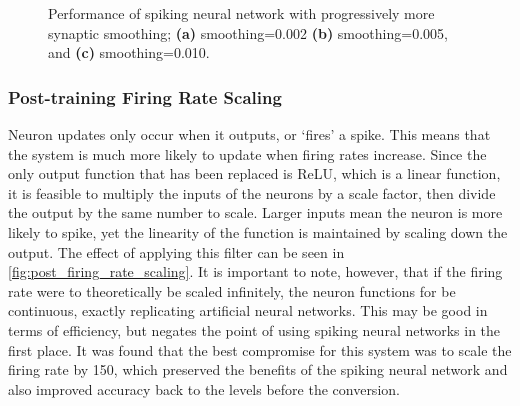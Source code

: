 \begin{figure}[htb]%
    \centering
    \qquad
    \qquad
    \caption{Performance of spiking neural network with progressively more synaptic smoothing; \textbf{(a)} smoothing=0.002 \textbf{(b)} smoothing=0.005, and \textbf{(c)} smoothing=0.010.}%
    \label{fig:post_synaptic_smoothing}%
\end{figure}

\subsubsection{Post-training Firing Rate Scaling} \label{sssec:firing_rate_scaling}

Neuron updates only occur when it outputs, or `fires' a spike. This means that the system is much more likely to update when firing rates increase. Since the only output function that has been replaced is ReLU, which is a linear function, it is feasible to multiply the inputs of the neurons by a scale factor, then divide the output by the same number to scale. Larger inputs mean the neuron is more likely to spike, yet the linearity of the function is maintained by scaling down the output. The effect of applying this filter can be seen in \cref{fig:post_firing_rate_scaling}. It is important to note, however, that if the firing rate were to theoretically be scaled infinitely, the neuron functions for be continuous, exactly replicating artificial neural networks. This may be good in terms of efficiency, but negates the point of using spiking neural networks in the first place. It was found that the best compromise for this system was to scale the firing rate by 150, which preserved the benefits of the spiking neural network and also improved accuracy back to the levels before the conversion.

